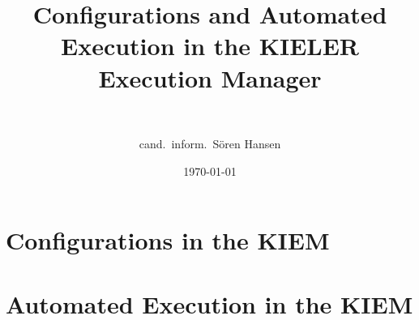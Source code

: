 \documentclass[11pt,a4paper,BCOR10mm,bibtotocnumbered]{scrbook}
\title{Configurations and Automated Execution in the KIELER Execution Manager}
\subtitle{~}
\author{cand.~inform.~S\"oren Hansen}
\date{\today}
\begin{document}
\frontmatter
\maketitle
% 

% 

\mainmatter


\part{Configurations in the KIEM}







\part{Automated Execution in the KIEM}









\appendix

\backmatter
%


%
%
\end{document}
